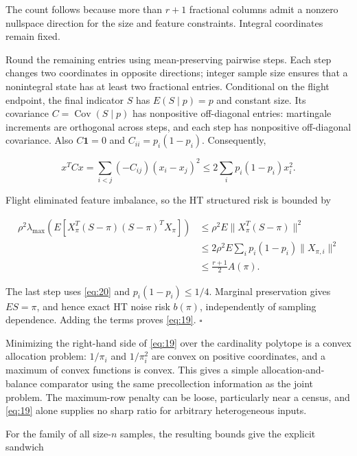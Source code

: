 \documentclass[11pt]{article}
\begin{document}
The count follows because more than \(r+1\) fractional columns admit a
nonzero nullspace direction for the size and feature constraints.
Integral coordinates remain fixed.

Round the remaining entries using mean-preserving pairwise steps. Each
step changes two coordinates in opposite directions; integer sample size
ensures that a nonintegral state has at least two fractional entries.
Conditional on the flight endpoint, the final indicator \(S\) has
\(E(S\mid p)=p\) and constant size. Its covariance
\(C=\operatorname{Cov}(S\mid p)\) has nonpositive off-diagonal entries:
martingale increments are orthogonal across steps, and each step has
nonpositive off-diagonal covariance. Also \(C\mathbf1=0\) and
\(C_{ii}=p_i(1-p_i)\). Consequently,

\begin{equation}\label{eq:21}
x^TCx=\sum_{i<j}(-C_{ij})(x_i-x_j)^2
\le2\sum_i p_i(1-p_i)x_i^2. 
\end{equation}

Flight eliminated feature imbalance, so the HT structured risk is
bounded by

\begin{equation}\label{eq:22}
\begin{aligned}
\rho^2\lambda_{\max}\!\left(E[X_\pi^T(S-\pi)(S-\pi)^TX_\pi]\right)
&\le \rho^2E\|X_\pi^T(S-\pi)\|^2\\
&\le2\rho^2E\sum_i p_i(1-p_i)\|X_{\pi,i}\|^2\\
&\le\frac{r+1}{2}A(\pi).
\end{aligned} 
\end{equation}

The last step uses \eqref{eq:20} and \(p_i(1-p_i)\le1/4\). Marginal
preservation gives \(ES=\pi\), and hence exact HT noise risk \(b(\pi)\),
independently of sampling dependence. Adding the terms proves
\eqref{eq:19}. \(\square\)

Minimizing the right-hand side of \eqref{eq:19} over the cardinality
polytope is a convex allocation problem: \(1/\pi_i\) and \(1/\pi_i^2\)
are convex on positive coordinates, and a maximum of convex functions is
convex. This gives a simple allocation-and-balance comparator using the
same precollection information as the joint problem. The maximum-row
penalty can be loose, particularly near a census, and \eqref{eq:19}
alone supplies no sharp ratio for arbitrary heterogeneous inputs.

For the family of all size-\(n\) samples, the resulting bounds give the
explicit sandwich
\end{document}
